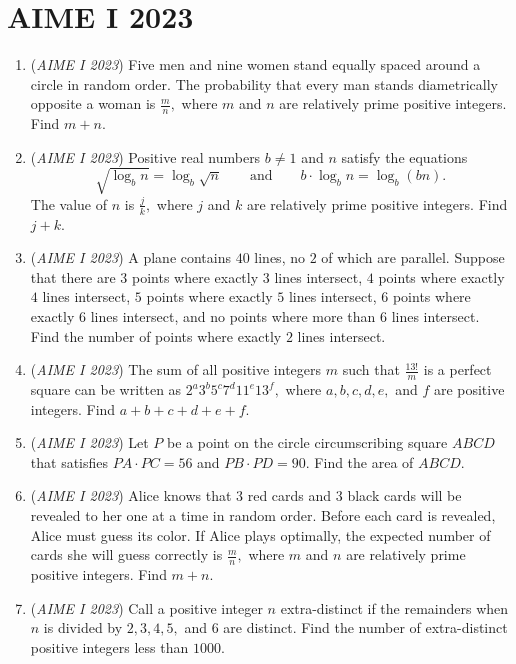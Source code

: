 \section{AIME I 2023}
        \begin{enumerate}
        	\item (\textit{AIME I 2023}) Five men and nine women stand equally spaced around a circle in random order. The probability that every man stands diametrically opposite a woman is $\frac{m}{n},$ where $m$ and $n$ are relatively prime positive integers. Find $m+n.$


	\item (\textit{AIME I 2023}) Positive real numbers $b \not= 1$ and $n$ satisfy the equations 
 \[\sqrt{\log_b n} = \log_b \sqrt{n} \qquad \text{and} \qquad b \cdot \log_b n = \log_b (bn).\] The value of $n$ is $\frac{j}{k},$ where $j$ and $k$ are relatively prime positive integers. Find $j+k.$


	\item (\textit{AIME I 2023}) A plane contains $40$ lines, no $2$ of which are parallel. Suppose that there are $3$ points where exactly $3$ lines intersect, $4$ points where exactly $4$ lines intersect, $5$ points where exactly $5$ lines intersect, $6$ points where exactly $6$ lines intersect, and no points where more than $6$ lines intersect. Find the number of points where exactly $2$ lines intersect.


 

	\item (\textit{AIME I 2023}) The sum of all positive integers $m$ such that $\frac{13!}{m}$ is a perfect square can be written as $2^a3^b5^c7^d11^e13^f,$ where $a,b,c,d,e,$ and $f$ are positive integers. Find $a+b+c+d+e+f.$


	\item (\textit{AIME I 2023}) Let $P$ be a point on the circle circumscribing square $ABCD$ that satisfies $PA \cdot PC = 56$ and $PB \cdot PD = 90.$ Find the area of $ABCD.$


	\item (\textit{AIME I 2023}) Alice knows that $3$ red cards and $3$ black cards will be revealed to her one at a time in random order. Before each card is revealed, Alice must guess its color. If Alice plays optimally, the expected number of cards she will guess correctly is $\frac{m}{n},$ where $m$ and $n$ are relatively prime positive integers. Find $m+n.$


	\item (\textit{AIME I 2023}) Call a positive integer $n$ extra-distinct if the remainders when $n$ is divided by $2, 3, 4, 5,$ and $6$ are distinct. Find the number of extra-distinct positive integers less than $1000$.



\end{enumerate}
